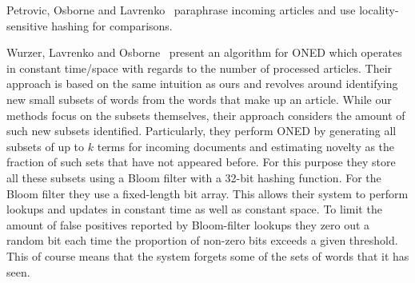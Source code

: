 
Petrovic, Osborne and Lavrenko~\cite{petrovic2012using} paraphrase incoming articles and use locality-sensitive hashing for comparisons. 

Wurzer, Lavrenko and Osborne~\cite{wurzer2015kterm} present an algorithm for ONED which operates in constant time/space with regards to the number of processed articles. Their approach is based on the same intuition as ours and revolves around identifying new small subsets of words from the words that make up an article. While our methods focus on the subsets themselves, their approach considers the amount of such new subsets identified. Particularly, they perform ONED by generating all subsets of up to $k$ terms for incoming documents and estimating novelty as the fraction of such sets that have not appeared before. 
For this purpose they store all these subsets using a Bloom filter with a 32-bit hashing function. For the Bloom filter they use a fixed-length bit array. This allows their system to perform lookups and updates in constant time as well as constant space. To limit the amount of false positives reported by Bloom-filter lookups they zero out a random bit each time the proportion of non-zero bits exceeds a given threshold. This of course means that the system forgets some of the sets of words that it has seen.
